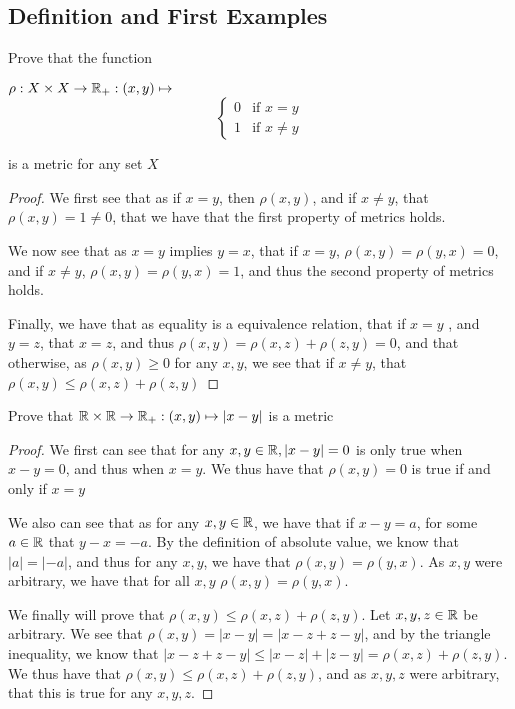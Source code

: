 \subsection{Definition and First Examples}

\begin{majorEx}%
  Prove that the function
  \begin{center}
  $\rho : X \times X \rightarrow \mathbb{R}_+ : (x,y) \mapsto $
  \[ \begin{cases} 
    0 & \text{if } x=y \\
    1 & \text{if } x \neq y 
  \end{cases}
  \]
\end{center}
\end{majorEx}
is a metric for any set $X$
\begin{proof}
   We first see that as if $x=y$, then $\rho(x,y)$, and if $x\neq y$, that $\rho(x,y)=1\neq 0$, that we have that the first property of metrics holds.

   We now see that as $x=y$ implies $y=x$, that if $x=y$, 
   $\rho(x,y)=\rho(y,x)=0$, and if $x\neq y$, $\rho(x,y)=\rho(y,x)=1$, and thus the 
   second property of metrics holds.

   Finally, we have that as equality is a equivalence relation, that if $x=y$ , and $y=z$, 
   that $x=z$, and thus $\rho(x,y) = \rho(x,z)+ \rho(z,y)=0$, and that otherwise, as $\rho(x,y)\geq 0$ for any $x,y$, we see that if $x\neq y$, that $\rho(x,y) \leq \rho(x,z)+ \rho(z,y)$   
\end{proof}  
  

\begin{majorEx} %
  Prove that $\mathbb{R} \times \mathbb{R} \rightarrow  \mathbb{R}_+ : (x,y) \mapsto |x-y|$ is a metric
\end{majorEx}

\begin{proof}
  We first can see that for any $x,y \in \mathbb{R}, |x-y|=0$ is only true when $x-y=0$, and thus
  when $x=y$. We thus have that $\rho(x,y)=0$ is true if and only if $x=y$
  
  We also can see that as for any $x,y\in \mathbb{R}$, we have that if
  $x-y=a$, for some $a\in \mathbb{R}$ that  $y-x={-a}$. By the definition of
  absolute value, we know that $|a| = |{-a}|$, and thus for any $x,y$,
  we have that $\rho(x,y) = \rho(y,x)$. As $x,y$ were arbitrary, we
  have that for all $x,y$ $\rho(x,y) = \rho(y,x)$.

  We finally will prove that $\rho(x,y) \leq \rho(x,z) + \rho(z,y)$.
  Let $x,y,z \in \mathbb{R}$ be arbitrary. We see that $\rho(x,y)= |x-y| = |x-z+z-y|$,
  and by the triangle inequality, we know that $|x-z+z-y|\leq |x-z| +
  |z-y|=\rho(x,z)+ \rho(z,y)$. We thus have that $\rho(x,y) \leq
  \rho(x,z) + \rho(z,y)$, and as $x,y,z$ were arbitrary, that this is
  true for any $x,y,z$.
\end{proof}
